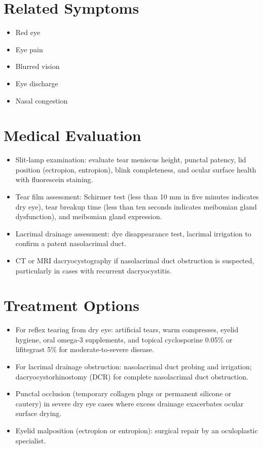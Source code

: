 \section*{Related Symptoms}
\begin{itemize}
  \item Red eye
  \item Eye pain
  \item Blurred vision
  \item Eye discharge
  \item Nasal congestion
\end{itemize}


\section*{Medical Evaluation}
\begin{itemize}
  \item Slit-lamp examination: evaluate tear meniscus height, punctal patency, lid position (ectropion, entropion), blink completeness, and ocular surface health with fluorescein staining.
  \item Tear film assessment: Schirmer test (less than 10 mm in five minutes indicates dry eye), tear breakup time (less than ten seconds indicates meibomian gland dysfunction), and meibomian gland expression.
  \item Lacrimal drainage assessment: dye disappearance test, lacrimal irrigation to confirm a patent nasolacrimal duct.
  \item CT or MRI dacryocystography if nasolacrimal duct obstruction is suspected, particularly in cases with recurrent dacryocystitis.
\end{itemize}

\section*{Treatment Options}
\begin{itemize}
  \item For reflex tearing from dry eye: artificial tears, warm compresses, eyelid hygiene, oral omega-3 supplements, and topical cyclosporine 0.05\% or lifitegrast 5\% for moderate-to-severe disease.
  \item For lacrimal drainage obstruction: nasolacrimal duct probing and irrigation; dacryocystorhinostomy (DCR) for complete nasolacrimal duct obstruction.
  \item Punctal occlusion (temporary collagen plugs or permanent silicone or cautery) in severe dry eye cases where excess drainage exacerbates ocular surface drying.
  \item Eyelid malposition (ectropion or entropion): surgical repair by an oculoplastic specialist.
\end{itemize}

